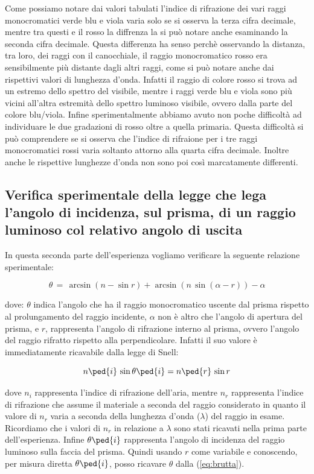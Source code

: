 Come possiamo notare dai valori tabulati l'indice di rifrazione dei vari raggi monocromatici verde blu e viola varia solo se si osserva la terza cifra decimale, mentre tra questi e il rosso la diffrenza la si può notare anche esaminando la seconda cifra decimale. Questa differenza ha senso perchè osservando la distanza, tra loro, dei raggi con il canocchiale, il raggio monocromatico rosso era sensibilmente più distante dagli altri raggi, come si può notare anche dai rispettivi valori di lunghezza d'onda. Infatti il raggio di colore rosso si trova ad un estremo dello spettro del visibile, mentre i raggi verde blu e viola sono più vicini all'altra estremità dello spettro luminoso visibile, ovvero dalla parte del colore blu/viola. Infine sperimentalmente abbiamo avuto non poche difficoltà ad individuare le due gradazioni di rosso oltre a quella primaria. Questa difficoltà si può comprendere se si osserva che l'indice di rifraione per i tre raggi monocromatici rossi varia soltanto attorno alla quarta cifra decimale. Inoltre anche le rispettive lunghezze d'onda non sono poi così marcatamente differenti.

\subsection{Verifica sperimentale della legge che lega l'angolo di incidenza, sul prisma, di un raggio luminoso col relativo angolo di uscita}

In questa seconda parte dell'esperienza vogliamo verificare la seguente relazione sperimentale:

\begin{equation}
	\theta \,=\, \arcsin{(n - \sin{r})} + \arcsin{(n \, \sin{(\alpha - r)})} - \alpha
	\label{eq:brutta}
\end{equation}

dove: $\theta$ indica l'angolo che ha il raggio monocromatico uscente dal prisma rispetto al prolungamento del raggio incidente, $\alpha$ non è altro che l'angolo di apertura del prisma, e $r$, rappresenta l'angolo di rifrazione interno al prisma, ovvero l'angolo del raggio rifratto rispetto alla perpendicolare. Infatti il suo valore è immediatamente ricavabile dalla legge di Snell:

\begin{equation}
	 n\ped{i} \, \sin{\theta\ped{i}} = n\ped{r} \, \sin{r}
	 \label{snell}
\end{equation}

dove $n_i$ rappresenta l'indice di rifrazione dell'aria, mentre $n_r$ rappresenta l'indice di rifrazione che assume il materiale a seconda del raggio considerato in quanto il valore di $n_r$ varia a seconda della lunghezza d'onda ($\lambda$) del raggio in esame. Ricordiamo che i valori di $n_r$ in relazione a $\lambda$ sono stati ricavati nella prima parte dell'esperienza. Infine $\theta\ped{i}$ rappresenta l'angolo di incidenza del raggio luminoso sulla faccia del prisma.
Quindi usando $r$ come variabile e conoscendo, per misura diretta $\theta\ped{i}$, posso ricavare $\theta$ dalla (\ref{eq:brutta}).

